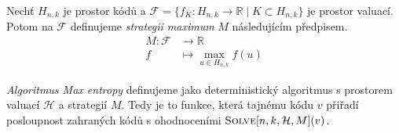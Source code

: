 \begin{definice}\label{defstrategiemaximum}
    Nechť $H_{n,k}$ je prostor kódů a $\mathcal{F} = \{f_K\colon H_{n,k} \to \mathbb{R} \mid K \subset H_{n,k}\}$ je prostor valuací. Potom na $\mathcal{F}$ definujeme \emph{strategii maximum} $M$ následujícím předpisem.
    \begin{align*}
        M \colon \mathcal{F} &\to \mathbb{R} \\
        f &\mapsto \max_{u\in H_{n,k}} f(u)
    \end{align*}
\end{definice}


\begin{definice}
    \emph{Algoritmus Max entropy} definujeme jako deterministický algoritmus s prostorem valuací $\mathcal{H}$ a strategií $M$. Tedy je to funkce, která tajnému kódu $v$ přiřadí posloupnost zahraných kódů s ohodnoceními $\textsc{Solve}[n, k, \mathcal{H}, M](v)$.
\end{definice}


